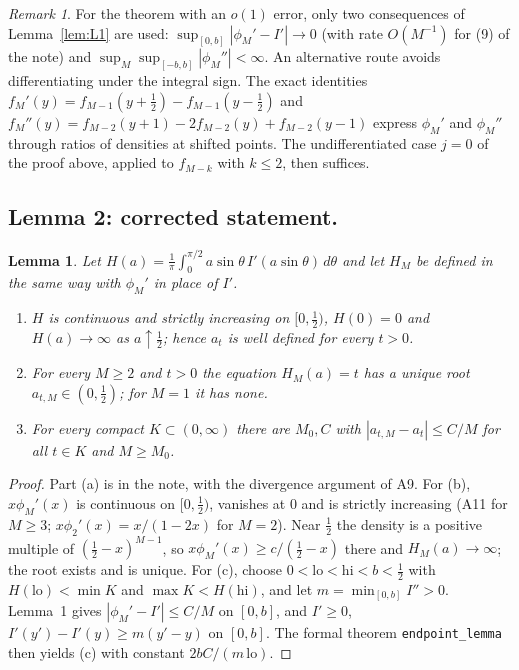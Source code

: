 \documentclass[11pt,a4paper]{article}
\newtheorem{lemma}{Lemma}
\theoremstyle{remark}
\newtheorem{remark}{Remark}
\numberwithin{equation}{section}
\begin{document}
\begin{remark}
For the theorem with an $o(1)$ error, only two consequences of Lemma~\ref{lem:L1} are used:
$\sup_{[0,b]}|\phi_M'-I'|\to0$ (with rate $O(M^{-1})$ for (9) of the note) and
$\sup_M\sup_{[-b,b]}|\phi_M''|<\infty$. An alternative route avoids differentiating under
the integral sign. The exact identities $f_M'(y)=f_{M-1}(y+\frac12)-f_{M-1}(y-\frac12)$ and
$f_M''(y)=f_{M-2}(y+1)-2f_{M-2}(y)+f_{M-2}(y-1)$ express $\phi_M'$ and $\phi_M''$ through
ratios of densities at shifted points. The undifferentiated case $j=0$ of the proof above,
applied to $f_{M-k}$ with $k\le2$, then suffices.
\end{remark}

\subsection{Lemma 2: corrected statement.}\label{sec:L2}

\begin{lemma}\label{lem:L2}
Let $H(a)=\frac1\pi\int_0^{\pi/2}a\sin\theta\,I'(a\sin\theta)\,d\theta$ and let $H_M$ be
defined in the same way with $\phi_M'$ in place of $I'$.
\begin{enumerate}
\item[(a)] $H$ is continuous and strictly increasing on $[0,\frac12)$, $H(0)=0$ and
$H(a)\to\infty$ as $a\uparrow\frac12$; hence $a_t$ is well defined for every $t>0$.
\item[(b)] For every $M\ge2$ and $t>0$ the equation $H_M(a)=t$ has a unique root
$a_{t,M}\in(0,\frac12)$; for $M=1$ it has none.
\item[(c)] For every compact $K\subset(0,\infty)$ there are $M_0,C$ with
$|a_{t,M}-a_t|\le C/M$ for all $t\in K$ and $M\ge M_0$.
\end{enumerate}
\end{lemma}

\begin{proof}
Part (a) is in the note, with the divergence argument of A9. For (b), $x\phi_M'(x)$ is
continuous on $[0,\frac12)$, vanishes at $0$ and is strictly increasing (A11 for $M\ge3$;
$x\phi_2'(x)=x/(1-2x)$ for $M=2$). Near $\frac12$ the density is a positive multiple of
$(\frac12-x)^{M-1}$, so $x\phi_M'(x)\ge c/(\frac12-x)$ there and $H_M(a)\to\infty$; the
root exists and is unique. For (c), choose $0<\mathrm{lo}<\mathrm{hi}<b<\frac12$ with
$H(\mathrm{lo})<\min K$ and $\max K<H(\mathrm{hi})$, and let $m=\min_{[0,b]}I''>0$. Lemma~1
gives $|\phi_M'-I'|\le C/M$ on $[0,b]$, and $I'\ge0$, $I'(y')-I'(y)\ge m(y'-y)$ on $[0,b]$.
The formal theorem \texttt{endpoint\_lemma} then yields (c) with constant $2bC/(m\,\mathrm{lo})$.
\end{proof}
\end{document}
